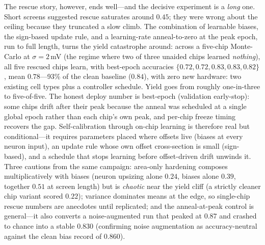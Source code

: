 \documentclass[11pt]{article}
\begin{document}
The rescue story, however, ends well---and the decisive experiment is a \emph{long} one. Short screens suggested rescue saturates around $0.45$; they were wrong about the ceiling because they truncated a slow climb. The combination of learnable biases, the sign-based update rule, and a learning-rate anneal-to-zero at the peak epoch, run to full length, turns the yield catastrophe around: across a five-chip Monte-Carlo at $\sigma{=}2$\,mV (the regime where two of three unaided chips learned \emph{nothing}), all five rescued chips learn, with best-epoch accuracies $\{0.72, 0.72, 0.83, 0.83, 0.82\}$, mean $\mathbf{0.78}$---93\% of the clean baseline ($0.84$), with zero new hardware: two existing cell types plus a controller schedule. Yield goes from roughly one-in-three to five-of-five. The honest deploy number is best-epoch (validation early-stop): some chips drift after their peak because the anneal was scheduled at a single global epoch rather than each chip's own peak, and per-chip freeze timing recovers the gap. Self-calibration through on-chip learning is therefore real but conditional---it requires parameters placed where offsets live (biases at every neuron input), an update rule whose own offset cross-section is small (sign-based), and a schedule that stops learning before offset-driven drift unwinds it. Three cautions from the same campaign: area-only hardening composes multiplicatively with biases (neuron upsizing alone $0.24$, biases alone $0.39$, together $0.51$ at screen length) but is \emph{chaotic} near the yield cliff (a strictly cleaner chip variant scored $0.22$); variance dominates means at the edge, so single-chip rescue numbers are anecdotes until replicated; and the anneal-at-peak control is general---it also converts a noise-augmented run that peaked at $0.87$ and crashed to chance into a stable $0.830$ (confirming noise augmentation as accuracy-neutral against the clean bias record of $0.860$).
\end{document}
